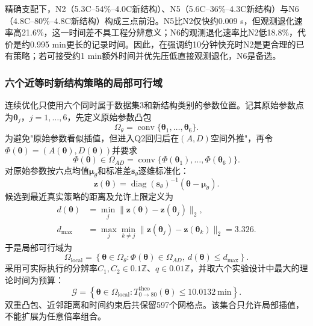 \documentclass[withoutpreface]{cumcmthesis}
\begin{document}
精确支配下，N2（5.3C--54\%--4.0C新结构）、N5（5.6C--36\%--4.3C新结构）与N6（4.8C--80\%--4.8C新结构）构成三点前沿。N5比N2仅快约0.009 s，但观测退化速率高21.6\%，这一时间差不具工程分辨意义；N6的观测退化速率比N2低18.8\%，代价是约0.995 min更长的记录时间。因此，在强调约10分钟快充时N2是更合理的已有策略；若可接受约1 min额外时间并优先压低直接观测退化，N6是备选。

\subsubsection{六个近等时新结构策略的局部可行域}

连续优化只使用六个同时属于数据集3和新结构类别的参数位置。记其原始参数点为$\boldsymbol\theta_j$，$j=1,\ldots,6$，先定义原始参数凸包
\begin{equation}
\Omega_{\theta}=\operatorname{conv}\{\boldsymbol\theta_1,\ldots,\boldsymbol\theta_6\}.
\end{equation}
为避免"原始参数看似插值，但进入Q2回归后在$(A,D)$空间外推"，再令$\Phi(\boldsymbol\theta)=(A(\boldsymbol\theta),D(\boldsymbol\theta))$并要求
\begin{equation}
\Phi(\boldsymbol\theta)\in
\Omega_{AD}=\operatorname{conv}\{\Phi(\boldsymbol\theta_1),\ldots,\Phi(\boldsymbol\theta_6)\}.
\end{equation}
对原始参数按六点均值$\boldsymbol\mu_\theta$和标准差$\boldsymbol s_\theta$逐维标准化：
\begin{equation}
\boldsymbol z(\boldsymbol\theta)
=\operatorname{diag}(\boldsymbol s_\theta)^{-1}
(\boldsymbol\theta-\boldsymbol\mu_\theta).
\end{equation}
候选到最近真实策略的距离及允许上限定义为
\begin{align}
d(\boldsymbol\theta)&=\min_j
\|\boldsymbol z(\boldsymbol\theta)-\boldsymbol z(\boldsymbol\theta_j)\|_2,\\
d_{\max}&=\max_j\min_{k\ne j}
\|\boldsymbol z(\boldsymbol\theta_j)-\boldsymbol z(\boldsymbol\theta_k)\|_2=3.326.
\end{align}
于是局部可行域为
\begin{equation}
\boxed{\Omega_{\mathrm{local}}=\left\{
\boldsymbol\theta\in\Omega_{\theta}:
\Phi(\boldsymbol\theta)\in\Omega_{AD},\ d(\boldsymbol\theta)\le d_{\max}
\right\}}.
\end{equation}
采用可实际执行的分辨率$C_1,C_2\in0.1\mathbb Z$、$q\in0.01\mathbb Z$，并取六个实验设计中最大的理论时间为预算：
\begin{equation}
\mathcal G=\left\{\boldsymbol\theta\in\Omega_{\mathrm{local}}:
T_{0\rightarrow80}^{\mathrm{theo}}(\boldsymbol\theta)\le10.0132\ \mathrm{min}
\right\}.
\end{equation}
双重凸包、近邻距离和时间约束后共保留597个网格点。该集合只允许局部插值，不能扩展为任意倍率组合。
\end{document}
